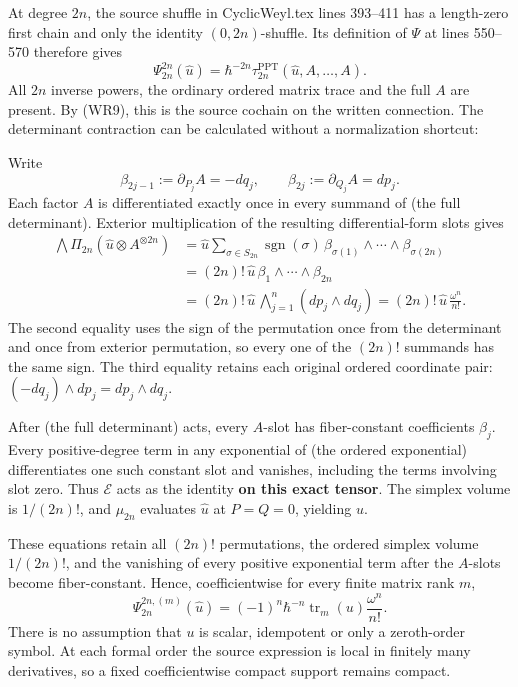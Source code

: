 \documentclass[
  11pt,
]{article}
\begin{document}
At degree \(2n\), the source shuffle in CyclicWeyl.tex lines 393--411
has a length-zero first chain and only the identity \((0,2n)\)-shuffle.
Its definition of \(\Psi\) at lines 550--570 therefore gives \[
 \Psi_{2n}^{2n}(\widehat u)
  =\hbar^{-2n}\tau_{2n}^{\mathrm{PPT}}
       (\widehat u,A,\ldots,A).
 \tag{WR11}
\] All \(2n\) inverse powers, the ordinary ordered matrix trace and the
full \(A\) are present. By (WR9), this is the source cochain on the
written connection. The determinant contraction can be calculated
without a normalization shortcut:

Write \[
 \beta_{2j-1}:=\partial_{P_j}A=-dq_j,\qquad
 \beta_{2j}:=\partial_{Q_j}A=dp_j .
 \tag{FD5}
\] Each factor \(A\) is differentiated exactly once in every summand of
(the full determinant). Exterior multiplication of the resulting
differential-form slots gives \[
 \begin{aligned}
 \bigwedge \Pi_{2n}
   (\widehat u\otimes A^{\otimes2n})
 &=\widehat u\sum_{\sigma\in S_{2n}}
     \operatorname{sgn}(\sigma)\,
       \beta_{\sigma(1)}\wedge\cdots\wedge\beta_{\sigma(2n)}\\
 &=(2n)!\,\widehat u\,
     \beta_1\wedge\cdots\wedge\beta_{2n}\\
 &=(2n)!\,\widehat u\,
     \bigwedge_{j=1}^n(dp_j\wedge dq_j)
 =(2n)!\,\widehat u\,\frac{\omega^n}{n!}.
 \end{aligned}
 \tag{FD6}
\] The second equality uses the sign of the permutation once from the
determinant and once from exterior permutation, so every one of the
\((2n)!\) summands has the same sign. The third equality retains each
original ordered coordinate pair:
\((-dq_j)\wedge dp_j=dp_j\wedge dq_j\).

After (the full determinant) acts, every \(A\)-slot has fiber-constant
coefficients \(\beta_j\). Every positive-degree term in any exponential
of (the ordered exponential) differentiates one such constant slot and
vanishes, including the terms involving slot zero. Thus \(\mathcal E\)
acts as the identity \textbf{on this exact tensor}. The simplex volume
is \(1/(2n)!\), and \(\mu_{2n}\) evaluates \(\widehat u\) at \(P=Q=0\),
yielding \(u\).

These equations retain all \((2n)!\) permutations, the ordered simplex
volume \(1/(2n)!\), and the vanishing of every positive exponential term
after the \(A\)-slots become fiber-constant. Hence, coefficientwise for
every finite matrix rank \(m\), \[
 \boxed{\quad
 \Psi_{2n}^{2n,(m)}(\widehat u)
 =(-1)^n\hbar^{-n}\operatorname{tr}_m(u)\frac{\omega^n}{n!}.
 \quad}
 \tag{WR12}
\] There is no assumption that \(u\) is scalar, idempotent or only a
zeroth-order symbol. At each formal order the source expression is local
in finitely many derivatives, so a fixed coefficientwise compact support
remains compact.
\end{document}

